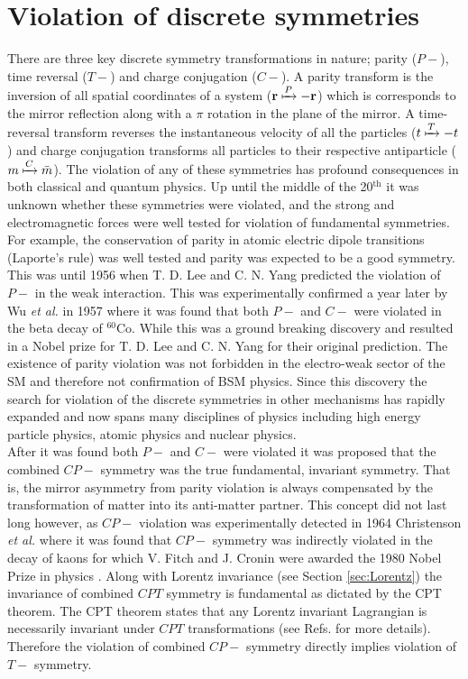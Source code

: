 \documentclass[10pt,a4paper, twoside, openright]{report}
\begin{document}
\section{Violation of discrete symmetries}
There are three key discrete symmetry transformations in nature; parity ($P-$), time reversal ($T-$) and charge conjugation ($C-$). A parity transform is the inversion of all spatial coordinates of a system ($\textbf{r} \xmapsto{P} -\textbf{r}$) which is corresponds to the mirror reflection along with a $\pi$ rotation in the plane of the mirror. A time-reversal transform reverses the instantaneous velocity of all the particles ($t \xmapsto{T} -t$) and charge conjugation transforms all particles to their respective antiparticle ($m \xmapsto{C} \bar{m}$). The violation of any of these symmetries has profound consequences in both classical and quantum physics. Up until the middle of the 20$^{\text{th}}$ it was unknown whether these symmetries were violated, and the strong and electromagnetic forces were well tested for violation of fundamental symmetries.  For example, the conservation of parity in atomic electric dipole transitions (Laporte's rule) was well tested and parity was expected to be a good symmetry. This was until 1956 when T. D. Lee and C. N. Yang predicted the violation of $P-$ in the weak interaction\cite{Yang1956}.  This was experimentally confirmed a year later  by Wu \textit{et al.} in 1957 \cite{Wu1957} where it was found that both $P-$ and $C-$ were violated in the beta decay of $^{60}$Co. While this was a ground breaking discovery and resulted in a Nobel prize for  T. D. Lee and C. N. Yang for their original prediction. The existence of parity violation was not forbidden in the electro-weak sector of the SM and therefore not confirmation of BSM physics.   Since this discovery the search for violation of the discrete symmetries in other mechanisms has rapidly expanded and now spans many disciplines of physics including high energy particle physics, atomic physics and nuclear physics. \\
\linebreak
After it was found both $P-$ and $C-$ were violated it was proposed that the combined $CP-$ symmetry was the true fundamental, invariant symmetry. That is, the mirror asymmetry from parity violation is always compensated by the transformation of matter into its anti-matter partner.  This concept did not last long however, as  $CP-$ violation was experimentally detected in 1964 Christenson \textit{et al.} \cite{Christenson1964} where it was found that $CP-$ symmetry was indirectly violated in the decay of kaons for which V. Fitch and J. Cronin  were awarded the 1980 Nobel Prize in physics \cite{Cronin1981}. Along with Lorentz invariance (see Section \ref{sec:Lorentz}) the invariance of combined $CPT$ symmetry is fundamental as dictated by the CPT theorem. The CPT theorem states that any Lorentz invariant Lagrangian is necessarily invariant under $CPT$ transformations (see Refs. \cite{LandauVol4, KhriplovichCP, HenleyCP} for more details). Therefore the violation of combined $CP-$ symmetry directly implies violation of $T-$ symmetry. \\
\end{document}

